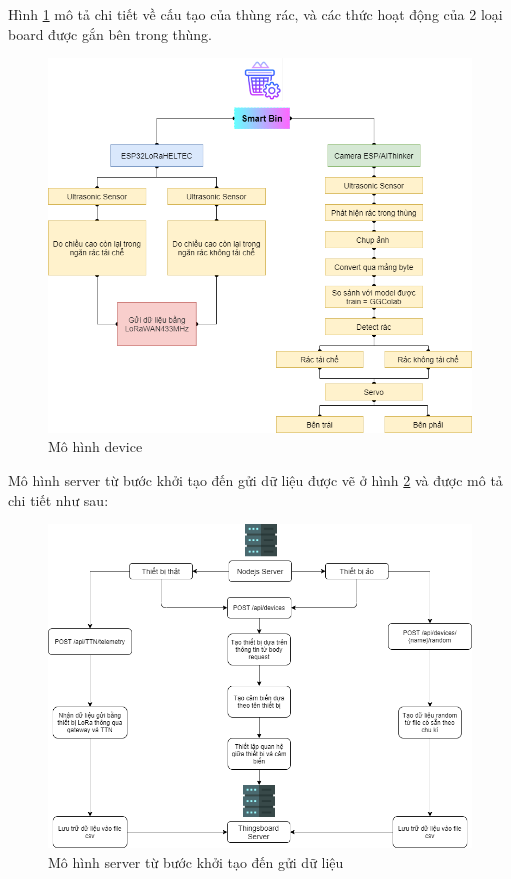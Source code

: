 Hình \ref{fig:chart_smartbin} mô tả chi tiết về cấu tạo của thùng rác, và các thức hoạt động của 2 loại board được gắn bên trong thùng. 
\begin{figure}[H]
    \centering
    \includegraphics[width=\textwidth]{images/Chart_smartbin.png}
    \caption{Mô hình device}
    \label{fig:chart_smartbin}
\end{figure}


Mô hình server từ bước khởi tạo đến gửi dữ liệu được vẽ ở hình \ref{fig:chart_server1} và được mô tả chi tiết như sau:
\begin{figure}[H]
    \centering
    \includegraphics[width=\textwidth]{images/Khanh/Nodejs/Chart_server1.png}
    \caption{Mô hình server từ bước khởi tạo đến gửi dữ liệu}
    \label{fig:chart_server1}
\end{figure}

